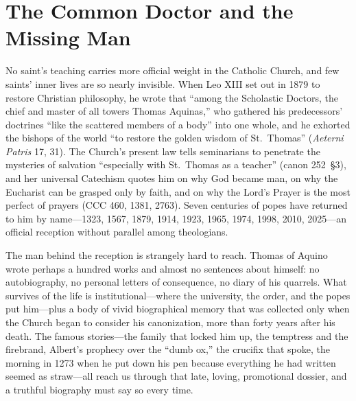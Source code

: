 \section{The Common Doctor and the Missing Man}

No saint's teaching carries more official weight in the Catholic Church,
and few saints' inner lives are so nearly invisible. When Leo XIII set out
in 1879 to restore Christian philosophy, he wrote that ``among the
Scholastic Doctors, the chief and master of all towers Thomas Aquinas,''
who gathered his predecessors' doctrines ``like the scattered members of a
body'' into one whole, and he exhorted the bishops of the world ``to
restore the golden wisdom of St.~Thomas'' (\textit{Aeterni Patris} 17, 31).
The Church's present law tells seminarians to penetrate the mysteries of
salvation ``especially with St.~Thomas as a teacher'' (canon 252~\S3), and
her universal Catechism quotes him on why God became man, on why the
Eucharist can be grasped only by faith, and on why the Lord's Prayer is the
most perfect of prayers (CCC 460, 1381, 2763). Seven centuries of popes
have returned to him by name---1323, 1567, 1879, 1914, 1923, 1965, 1974,
1998, 2010, 2025---an official reception without parallel among
theologians.

The man behind the reception is strangely hard to reach. Thomas of Aquino
wrote perhaps a hundred works and almost no sentences about himself: no
autobiography, no personal letters of consequence, no diary of his
quarrels. What survives of the life is institutional---where the
university, the order, and the popes put him---plus a body of vivid
biographical memory that was collected only when the Church began to
consider his canonization, more than forty years after his death. The
famous stories---the family that locked him up, the temptress and the
firebrand, Albert's prophecy over the ``dumb ox,'' the crucifix that spoke,
the morning in 1273 when he put down his pen because everything he had
written seemed as straw---all reach us through that late, loving,
promotional dossier, and a truthful biography must say so every time.

